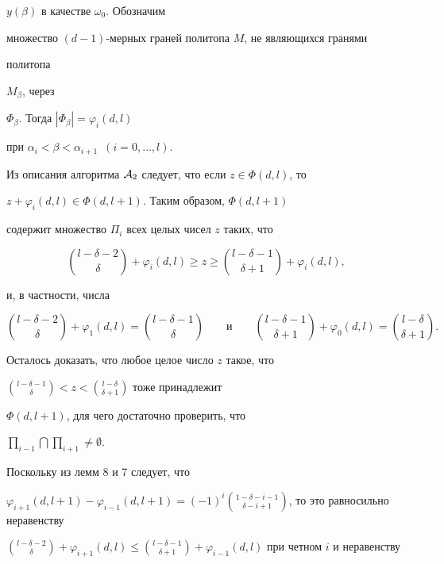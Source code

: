 $y(\beta)$ в качестве $\omega_0$. Обозначим


множество $(d-1)$-мерных граней политопа $M$, не являющихся гранями


политопа


$M_\beta$, через


${\Phi}_\beta$. Тогда $|{\Phi}_\beta|=\varphi_i(d,l)$


при $\alpha_i<\beta<\alpha_{i+1}$\ $(i=0,\dotsc,l)$.


Из описания алгоритма ${\cal A}_2$ следует, что если $z\in \Phi(d,l)$, то


$z+\varphi_i(d,l) \in \Phi(d,l+1)$. Таким образом, $\Phi(d,l+1)$


содержит множество $\Pi_i$ всех целых чисел $z$ таких, что


$$


\binom{l-\delta-2}{\delta}+\varphi_i(d,l) \ge z \ge


\binom{l-\delta-1}{\delta+1}+\varphi_i(d,l),


$$


и, в частности, числа


$$


\binom{l-\delta-2}{\delta}+\varphi_1(d,l)=


\binom{l-\delta-1}{\delta}


\qquad


\text{и}


\qquad


\binom{l-\delta-1}{\delta+1}+\varphi_0(d,l)=


\binom{l-\delta}{\delta+1}.


$$





Осталось доказать, что любое целое число $z$ такое, что


$\binom{l-\delta-1}{\delta}<z<\binom{l-\delta}{\delta+1}$ тоже принадлежит


$\Phi(d,l+1)$, для чего достаточно проверить, что


$\prod\limits_{i-1} \bigcap \prod\limits_{i+1} \ne \emptyset$.


Поскольку из лемм 8 и 7 следует, что


$\varphi_{i+1}(d,l+1)-\varphi_{i-1}(d,l+1)=


(-1)^i\binom{1-\delta -i-1}{\delta -i+1}$, то это равносильно неравенству


$\binom{l-\delta -2}{\delta}+\varphi_{i+1}(d,l) \le


\binom{l-\delta-1}{\delta+1}+\varphi_{i-1}(d,l)$ при четном $i$ и неравенству


